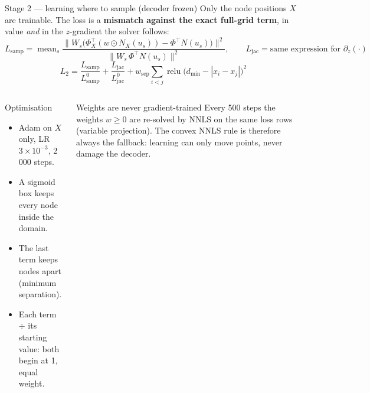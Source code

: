 \documentclass[10pt,aspectratio=169]{beamer}
\newcommand{\T}{^{\top}}
\begin{document}
\begin{frame}{Stage 2 --- learning where to sample (decoder frozen)}
  \small Only the node positions $X$ are trainable. The loss is a \textbf{mismatch against the exact full-grid term}, in value \emph{and} in the $z$-gradient the solver follows:
  \[
    L_{\mathrm{samp}} = \operatorname{mean}_s
      \frac{\big\|W_s\big(\Phi_X\T(w\odot N_X(u_s)) - \Phi\T N(u_s)\big)\big\|^2}{\|W_s\,\Phi\T N(u_s)\|^2},
    \qquad L_{\mathrm{jac}} = \text{same expression for }\partial_z(\cdot)
  \]
  \[
    L_2 = \frac{L_{\mathrm{samp}}}{L_{\mathrm{samp}}^{0}} + \frac{L_{\mathrm{jac}}}{L_{\mathrm{jac}}^{0}}
        + w_{\mathrm{sep}}\sum_{i<j}\operatorname{relu}\big(d_{\min}-|x_i-x_j|\big)^2
  \]
  \footnotesize
  \begin{columns}[T]
    \begin{block}{Optimisation}
      \begin{itemize}
        \item Adam on $X$ only, LR $3\times10^{-3}$, 2\,000 steps.
        \item A sigmoid box keeps every node inside the domain.
        \item The last term keeps nodes apart (minimum separation).
        \item Each term $\div$ its starting value: both begin at 1, equal weight.
      \end{itemize}
    \end{block}
    \begin{exampleblock}{Weights are never gradient-trained}
      Every 500 steps the weights $w\ge0$ are re-solved by NNLS on the same loss rows (variable projection). The convex NNLS rule is therefore always the fallback: learning can only move points, never damage the decoder.
    \end{exampleblock}
  \end{columns}
\end{frame}
\end{document}
